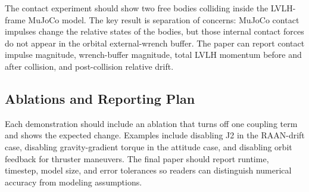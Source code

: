 The contact experiment should show two free bodies colliding inside the
LVLH-frame MuJoCo model. The key result is separation of concerns: MuJoCo
contact impulses change the relative states of the bodies, but those internal
contact forces do not appear in the orbital external-wrench buffer. The paper
can report contact impulse magnitude, wrench-buffer magnitude, total LVLH
momentum before and after collision, and post-collision relative drift.

\subsection{Ablations and Reporting Plan}

Each demonstration should include an ablation that turns off one coupling
term and shows the expected change. Examples include disabling J2 in the
RAAN-drift case, disabling gravity-gradient torque in the attitude case, and
disabling orbit feedback for thruster maneuvers. The final paper should
report runtime, timestep, model size, and error tolerances so readers can
distinguish numerical accuracy from modeling assumptions.
